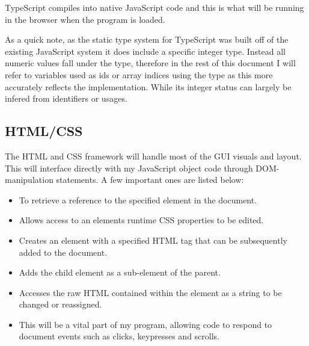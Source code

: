        TypeScript compiles into native JavaScript code and this is what will be running in the browser when the program is loaded.

        As a quick note, as the static type system for TypeScript was built off of the existing JavaScript system it does include a specific integer type. Instead all numeric values fall under the  type, therefore in the rest of this document I will refer to variables used as ids or array indices using the  type as this more accurately reflects the implementation. While its integer status can largely be infered from identifiers or usages.

    \subsection{HTML/CSS}
    \label{html/css}

        The HTML and CSS framework will handle most of the GUI visuals and layout. This will interface directly with my JavaScript object code through DOM-manipulation statements. A few important ones are listed below:

        \begin{itemize}
            \item {} To retrieve a reference to the specified element in the document.

            \item {} Allows access to an elements runtime CSS properties to be edited.

            \item {} Creates an element with a specified HTML tag that can be subsequently added to the document.

            \item {} Adds the child element as a sub-element of the parent.

            \item {} Accesses the raw HTML contained within the element as a string to be changed or reassigned.

            \item {} This will be a vital part of my program, allowing code to respond to document events such as clicks, keypresses and scrolls.
        \end{itemize}

